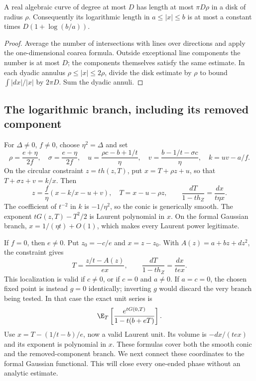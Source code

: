 \begin{lemma}\label{lem:curvelength}
A real algebraic curve of degree at most $D$ has length at most
$\pi D\rho$ in a disk of radius $\rho$. Consequently its logarithmic
length in $a\leq|x|\leq b$ is at most a constant times
$D(1+\log(b/a))$.
\end{lemma}
\begin{proof}
Average the number of intersections with lines over directions and
apply the one-dimensional coarea formula. Outside exceptional line
components the number is at most $D$; the components themselves
satisfy the same estimate. In each dyadic annulus
$\rho\leq|x|\leq2\rho$, divide the disk estimate by $\rho$ to
bound $\int|dx|/|x|$ by $2\pi D$. Sum the dyadic annuli.
\end{proof}

\subsection{The logarithmic branch, including its removed component}

For $\Delta\ne0$, $f\ne0$, choose $\eta^2=\Delta$ and set
\[
 \rho=\frac{e+\eta}{2f},\quad \sigma=\frac{e-\eta}{2f},\quad
 u=\frac{\rho c-b+1/t}{\eta},\quad
 v=\frac{b-1/t-\sigma c}{\eta},\quad k=uv-a/f.
\]
On the circular constraint $z=th(z,T)$, put
$x=T+\rho z+u$, so that $T+\sigma z+v=k/x$. Then
\[
 z=\frac f\eta(x-k/x-u+v),\quad T=x-u-\rho z,
 \qquad
 \frac{dT}{1-th_Z}=\frac{dx}{t\eta x}.
\]
The coefficient of $t^{-2}$ in $k$ is $-1/\eta^2$, so the conic
is generically smooth. The exponent $tG(z,T)-T^2/2$ is Laurent
polynomial in $x$. On the formal Gaussian branch,
$x=1/(\eta t)+O(1)$, which makes every Laurent power legitimate.

If $f=0$, then $e\ne0$. Put $z_0=-c/e$ and $x=z-z_0$. With
$A(z)=a+bz+dz^2$, the constraint gives
\[
 T=\frac{z/t-A(z)}{ex},\qquad
 \frac{dT}{1-th_Z}=\frac{dx}{tex}.
\]
This localization is valid if $c\ne0$, or if $c=0$ and $a\ne0$.
If $a=c=0$, the chosen fixed point is instead $g=0$ identically;
inverting $g$ would discard the very branch being tested. In that
case the exact unit series is
\[
 \E_T\left[\frac{e^{tG(0,T)}}{1-t(b+eT)}\right].
\]
Use $x=T-(1/t-b)/e$, now a valid Laurent unit. Its volume is
$-dx/(tex)$ and its exponent is polynomial in $x$. These formulas
cover both the smooth conic and the removed-component branch.
We next connect these coordinates to the formal Gaussian functional.
This will close every one-ended phase without an analytic estimate.


